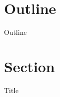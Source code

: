 \documentclass[hyperref={pdfpagelabels=false}]{beamer}
\title{}
\subtitle{}
\author{}
\date{\today}
\institute[Stanford]{Stanford University}
\begin{document}
\begin{frame}
\titlepage
\end{frame}

\section*{Outline}
\begin{frame}{Outline}
\tableofcontents
\end{frame}

\section{Section}
\begin{frame}{Title}
\end{frame}
\end{document}
